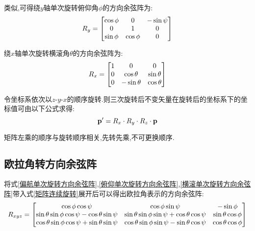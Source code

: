 类似,可得绕$y$轴单次旋转俯仰角$\phi$的方向余弦阵为:
\begin{equation}\label{俯仰单次旋转方向余弦阵}
    \begin{split}
        R_y=
        \left[\begin{matrix}
                \cos{\phi} & 0 & -\sin{\psi} \\
                0 & 1 & 0 \\
                \sin{\phi} & \cos{\phi} & 0 \\
        \end{matrix}\right]
    \end{split}
\end{equation}

绕$x$轴单次旋转横滚角$\theta$的方向余弦阵为:
\begin{equation}\label{横滚单次旋转方向余弦阵}
    \begin{split}
        R_x=
        \left[\begin{matrix}
                1 & 0 & 0 \\
                0 & \cos{\theta} & \sin{\theta} \\
                0 & -\sin{\theta} & \cos{\theta}
        \end{matrix}\right]
    \end{split}
\end{equation}

令坐标系依次以$z$-$y$-$x$的顺序旋转.则三次旋转后不变矢量在旋转后的坐标系下的坐标值可由以下公式求得:
\begin{equation}\label{矩阵连续旋转}
    \mathbf{p}' = R_x \cdot R_y \cdot R_z \cdot \mathbf{p}
\end{equation} 

矩阵左乘的顺序与旋转顺序相关,先转先乘,不可更换顺序.

\subsection{欧拉角转方向余弦阵}
将式\ref{偏航单次旋转方向余弦阵},\ref{俯仰单次旋转方向余弦阵},\ref{横滚单次旋转方向余弦阵}带入式\ref{矩阵连续旋转}展开后可以得出欧拉角表示的方向余弦阵:
\begin{equation}\label{欧拉角转方向余弦阵}
    \begin{split}
        R_{xyz}=
        \left[\begin{matrix}
                \cos{\phi}\cos{\psi} & \cos{\phi}\sin{\psi} & -\sin{\phi} \\
                \sin{\theta}\sin{\phi}\cos{\psi}-\cos{\theta}\sin{\psi} & \sin{\theta}\sin{\phi}\sin{\psi}+\cos{\theta}\cos{\psi} & \sin{\theta}\cos{\phi} \\
                \cos{\theta}\sin{\phi}\cos{\psi}+\sin{\theta}\sin{\psi} & \cos{\theta}\sin{\phi}\sin{\psi}-\sin{\theta}\cos{\psi} & \cos{\theta}\cos{\phi}
        \end{matrix}\right]
    \end{split}
\end{equation}

